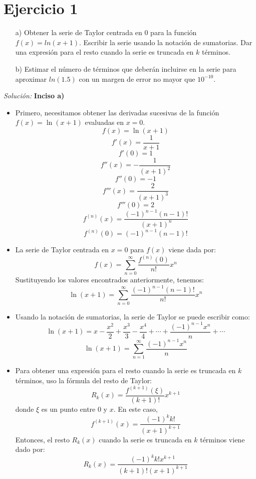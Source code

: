 \documentclass{article}
\newenvironment{solution}
    {\textit{Solución:}}
    {}
\begin{document}
\section*{Ejercicio 1}
\begin{itemize}
    \item[a)] Obtener la serie de Taylor centrada en 0 para la función $f(x) = ln(x + 1)$. Escribir la serie usando la notación de sumatorias. Dar una expresión para el resto cuando la serie es truncada en $k$ términos.
    \item[b)] Estimar el número de términos que deberán incluirse en la serie para aproximar $ln(1.5)$ con un margen de error no mayor que $10^{-10}$.
\end{itemize}

\begin{solution}
    \textbf{Inciso a)}
    \begin{itemize}
        \item Primero, necesitamos obtener las derivadas sucesivas de la función $f(x) = \ln(x + 1)$ evaluadas en $x = 0$.
        $$f(x) = \ln(x + 1)$$
        $$f'(x) = \frac{1}{x + 1}$$
        $$f'(0) = 1$$
        $$f''(x) = -\frac{1}{(x + 1)^2}$$
        $$f''(0) = -1$$
        $$f'''(x) = \frac{2}{(x + 1)^3}$$
        $$f'''(0) = 2$$
        $$f^{(n)}(x) = \frac{(-1)^{n-1}(n-1)!}{(x + 1)^n}$$
        $$f^{(n)}(0) = (-1)^{n-1}(n-1)!$$
        \item La serie de Taylor centrada en $x = 0$ para $f(x)$ viene dada por:
        $$f(x) = \sum_{n=0}^\infty \frac{f^{(n)}(0)}{n!}x^n$$
        Sustituyendo los valores encontrados anteriormente, tenemos:
        $$\ln(x + 1) = \sum_{n=0}^\infty \frac{(-1)^{n-1}(n-1)!}{n!}x^n$$
        \item Usando la notación de sumatorias, la serie de Taylor se puede escribir como:
        $$\ln(x + 1) = x - \frac{x^2}{2} + \frac{x^3}{3} - \frac{x^4}{4} + \cdots + \frac{(-1)^{n-1}x^n}{n} + \cdots$$
        $$\ln(x + 1) = \sum_{n=1}^\infty \frac{(-1)^{n-1}x^n}{n}$$
        \item Para obtener una expresión para el resto cuando la serie es truncada en $k$ términos, uso la fórmula del resto de Taylor:
        $$R_k(x) = \frac{f^{(k+1)}(\xi)}{(k+1)!}x^{k+1}$$
        donde $\xi$ es un punto entre 0 y $x$.
        En este caso,
        $$f^{(k+1)}(x) = \frac{(-1)^k k!}{(x + 1)^{k+1}}$$
        Entonces, el resto $R_k(x)$ cuando la serie es truncada en $k$ términos viene dado por:
        $$R_k(x) = \frac{(-1)^k k! x^{k+1}}{(k+1)!(x + 1)^{k+1}}$$
    \end{itemize}
\end{solution}
\newpage
\end{document}
